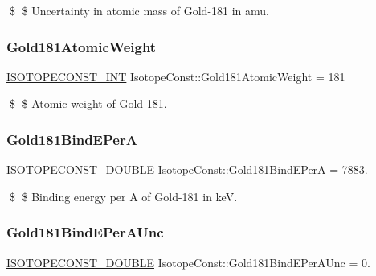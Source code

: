 \$ \$ Uncertainty in atomic mass of Gold-\/181 in amu. \mbox{\label{group___isotope_const-_gold-_au181_ga7dd57e17928460a4e65822ea5eef1b61}} 
\subsubsection{\texorpdfstring{Gold181\+Atomic\+Weight}{Gold181AtomicWeight}}
{\footnotesize\ttfamily \mbox{\hyperlink{group___isotope_const-_macros_ga5f18360b3e99483a35c32d789e62621c}{I\+S\+O\+T\+O\+P\+E\+C\+O\+N\+S\+T\+\_\+\+I\+NT}} Isotope\+Const\+::\+Gold181\+Atomic\+Weight = 181}

\$ \$ Atomic weight of Gold-\/181. \mbox{\label{group___isotope_const-_gold-_au181_ga9d941fc4659119aa14f4ec19a9d0d260}} 
\subsubsection{\texorpdfstring{Gold181\+Bind\+E\+PerA}{Gold181BindEPerA}}
{\footnotesize\ttfamily \mbox{\hyperlink{group___isotope_const-_macros_ga8f45a7272ce02c0b4c65c44636ed719a}{I\+S\+O\+T\+O\+P\+E\+C\+O\+N\+S\+T\+\_\+\+D\+O\+U\+B\+LE}} Isotope\+Const\+::\+Gold181\+Bind\+E\+PerA = 7883.}

\$ \$ Binding energy per A of Gold-\/181 in keV. \mbox{\label{group___isotope_const-_gold-_au181_ga72385fd2f4ac32f032ea4ea2288ade2f}} 
\subsubsection{\texorpdfstring{Gold181\+Bind\+E\+Per\+A\+Unc}{Gold181BindEPerAUnc}}
{\footnotesize\ttfamily \mbox{\hyperlink{group___isotope_const-_macros_ga8f45a7272ce02c0b4c65c44636ed719a}{I\+S\+O\+T\+O\+P\+E\+C\+O\+N\+S\+T\+\_\+\+D\+O\+U\+B\+LE}} Isotope\+Const\+::\+Gold181\+Bind\+E\+Per\+A\+Unc = 0.}

